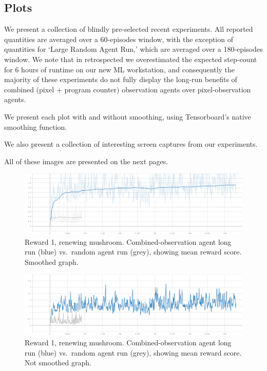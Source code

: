 \documentclass[]{article}
\begin{document}
\hypertarget{plots}{%
\subsection{Plots}\label{plots}}

We present a collection of blindly pre-selected recent experiments. All
reported quantities are averaged over a 60-episodes window, with the
exception of quantities for `Large Random Agent Run,' which are averaged
over a 180-episodes window. We note that in retrospected we
overestimated the expected step-count for 6 hours of runtime on our new
ML workstation, and consequently the majority of these experiments do
not fully display the long-run benefits of combined (pixel + program
counter) observation agents over pixel-observation agents.

We present each plot with and without smoothing, using Tensorboard's
native smoothing function.

We also present a collection of interesting screen captures from our
experiments.

All of these images are presented on the next pages.

\begin{figure}
\centering
\includegraphics{./img/114084663-b8619100-98b0-11eb-8002-249f71b21557.png}
\caption{Reward 1, renewing mushroom. Combined-observation agent long
run (blue) vs.~random agent run (grey), showing mean reward score.
Smoothed graph.}
\end{figure}

\begin{figure}
\centering
\includegraphics{./img/114084688-c31c2600-98b0-11eb-8a95-6bfd7e690953.png}
\caption{Reward 1, renewing mushroom. Combined-observation agent long
run (blue) vs.~random agent run (grey), showing mean reward score. Not
smoothed graph.}
\end{figure}
\end{document}
